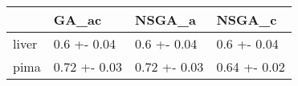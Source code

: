 \begin{tabular}{llll}
\toprule
{} &         GA\_ac &        NSGA\_a &        NSGA\_c \\
\midrule
liver &   0.6 +- 0.04 &   0.6 +- 0.04 &   0.6 +- 0.04 \\
pima  &  0.72 +- 0.03 &  0.72 +- 0.03 &  0.64 +- 0.02 \\
\bottomrule
\end{tabular}

